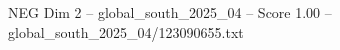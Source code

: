 \begin{textsample}{NEG Dim 2 – global\_south\_2025\_04 – Score 1.00 – global\_south\_2025\_04/123090655.txt}
\end{textsample}
